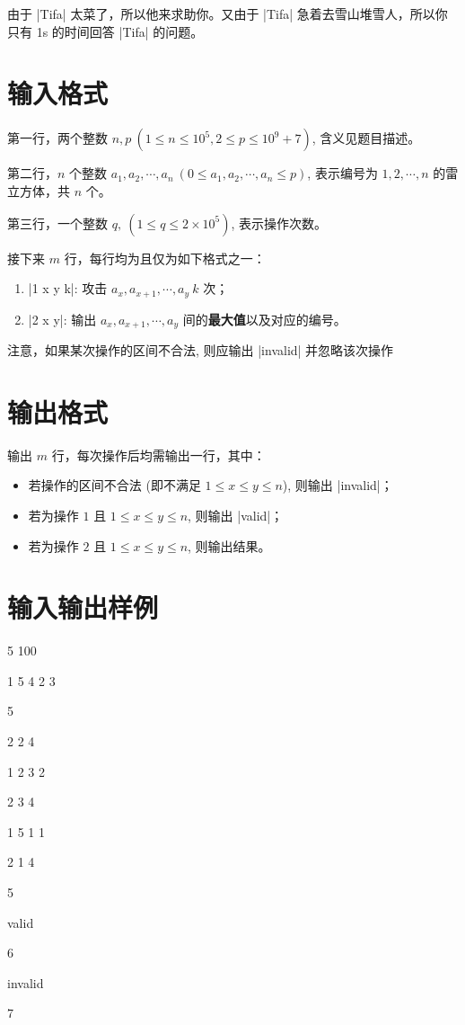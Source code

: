 \documentclass{ctpro}
\begin{document}
由于 |Tifa| 太菜了，所以他来求助你。又由于 |Tifa| 急着去雪山堆雪人，所以你只有 1s 的时间回答 |Tifa| 的问题。

\section*{输入格式}

第一行，两个整数 $n,p~(1 \leq n \leq 10^5, 2 \leq p \leq 10^9+7)$, 含义见题目描述。

第二行，$n$ 个整数 $a_1, a_2, \cdots, a_n~(0 \leq a_1, a_2, \cdots, a_n \leq p)$, 表示编号为 $1,2, \cdots, n$ 的雷立方体，共 $n$ 个。

第三行，一个整数 $q,~(1 \leq q \leq 2 \times 10^5)$, 表示操作次数。

接下来 $m$ 行，每行均为且仅为如下格式之一：

\begin{enumerate}
	\item |1 x y k|: 攻击 $a_x, a_{x+1}, \cdots, a_y~k$ 次；
	\item |2 x y|: 输出 $a_x, a_{x+1}, \cdots, a_y$ 间的\textbf{最大值}以及对应的编号。
\end{enumerate}

注意，如果某次操作的区间不合法, 则应输出 |invalid| 并忽略该次操作

\section*{输出格式}

输出 $m$ 行，每次操作后均需输出一行，其中：

\begin{itemize}
	\item 若操作的区间不合法 (即不满足 $1 \leq x \leq y \leq n$), 则输出 |invalid|；
	\item 若为操作 $1$ 且 $1 \leq x \leq y \leq n$, 则输出 |valid|；
	\item 若为操作 $2$ 且 $1 \leq x \leq y \leq n$, 则输出结果。
\end{itemize}

\section*{输入输出样例}
\testcasetab
{
	5 100\par
	1 5 4 2 3\par
	5\par
	2 2 4\par
	1 2 3 2\par
	2 3 4\par
	1 5 1 1\par
	2 1 4
}
{
	5\par
	valid\par
	6\par
	invalid\par
	7
}
\end{document}
